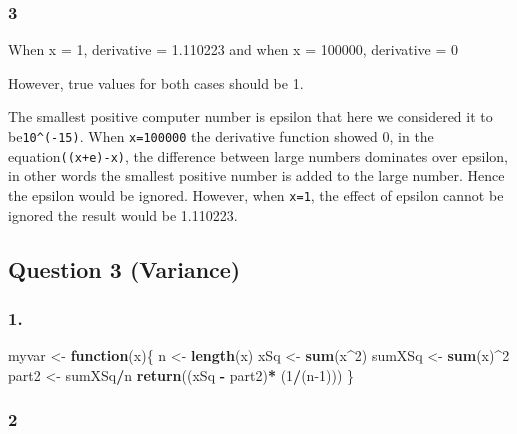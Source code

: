 \documentclass[
]{article}
\newenvironment{Shaded}{\begin{snugshade}}{\end{snugshade}}
\newcommand{\ControlFlowTok}[1]{\textcolor[rgb]{0.13,0.29,0.53}{\textbf{#1}}}
\newcommand{\DecValTok}[1]{\textcolor[rgb]{0.00,0.00,0.81}{#1}}
\newcommand{\KeywordTok}[1]{\textcolor[rgb]{0.13,0.29,0.53}{\textbf{#1}}}
\newcommand{\NormalTok}[1]{#1}
\newcommand{\OperatorTok}[1]{\textcolor[rgb]{0.81,0.36,0.00}{\textbf{#1}}}
\newcommand{\StringTok}[1]{\textcolor[rgb]{0.31,0.60,0.02}{#1}}
\begin{document}
\hypertarget{section-4}{%
\subsubsection{3}\label{section-4}}

When x = 1, derivative = 1.110223 and when x = 100000, derivative = 0

However, true values for both cases should be 1.

The smallest positive computer number is epsilon that here we considered
it to be\texttt{10\^{}(-15)}. When \texttt{x=100000} the derivative
function showed 0, in the equation\texttt{((x+e)-x)}, the difference
between large numbers dominates over epsilon, in other words the
smallest positive number is added to the large number. Hence the epsilon
would be ignored. However, when \texttt{x=1}, the effect of epsilon
cannot be ignored the result would be 1.110223.

\hypertarget{question-3-variance}{%
\subsection{Question 3 (Variance)}\label{question-3-variance}}

\hypertarget{section-5}{%
\subsubsection{1.}\label{section-5}}

\begin{Shaded}
\begin{Highlighting}[]
\NormalTok{myvar <-}\StringTok{ }\ControlFlowTok{function}\NormalTok{(x)\{}
\NormalTok{  n <-}\StringTok{ }\KeywordTok{length}\NormalTok{(x)}
\NormalTok{  xSq <-}\StringTok{ }\KeywordTok{sum}\NormalTok{(x}\OperatorTok{^}\DecValTok{2}\NormalTok{)}
\NormalTok{  sumXSq <-}\StringTok{ }\KeywordTok{sum}\NormalTok{(x)}\OperatorTok{^}\DecValTok{2}
\NormalTok{  part2 <-}\StringTok{ }\NormalTok{sumXSq}\OperatorTok{/}\NormalTok{n}
  \KeywordTok{return}\NormalTok{((xSq }\OperatorTok{-}\StringTok{ }\NormalTok{part2)}\OperatorTok{*}\StringTok{ }\NormalTok{(}\DecValTok{1}\OperatorTok{/}\NormalTok{(n}\DecValTok{-1}\NormalTok{)))}
\NormalTok{\}}
\end{Highlighting}
\end{Shaded}

\hypertarget{section-6}{%
\subsubsection{2}\label{section-6}}
\end{document}
